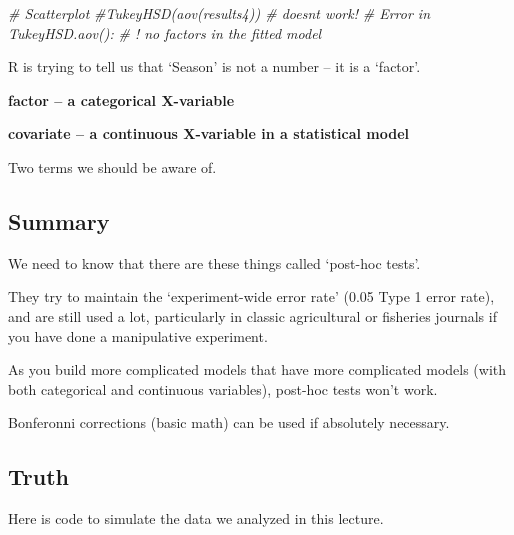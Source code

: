 \documentclass[
]{article}
\newenvironment{Shaded}{\begin{snugshade}}{\end{snugshade}}
\newcommand{\CommentTok}[1]{\textcolor[rgb]{0.56,0.35,0.01}{\textit{#1}}}
\begin{document}
\begin{Shaded}
\begin{Highlighting}[]
\CommentTok{\# Scatterplot}
\CommentTok{\#TukeyHSD(aov(results4)) \# doesn\textquotesingle{}t work!}
\CommentTok{\# Error in \textasciigrave{}TukeyHSD.aov()\textasciigrave{}:}
\CommentTok{\# ! no factors in the fitted model}
\end{Highlighting}
\end{Shaded}

R is trying to tell us that `Season' is not a number -- it is a
`factor'.

\textbf{factor -- a categorical X-variable}

\textbf{covariate -- a continuous X-variable in a statistical model}

Two terms we should be aware of.

\subsection{Summary}\label{summary}

We need to know that there are these things called `post-hoc tests'.

They try to maintain the `experiment-wide error rate' (0.05 Type 1 error
rate), and are still used a lot, particularly in classic agricultural or
fisheries journals if you have done a manipulative experiment.

As you build more complicated models that have more complicated models
(with both categorical and continuous variables), post-hoc tests won't
work.

Bonferonni corrections (basic math) can be used if absolutely necessary.

\subsection{Truth}\label{truth}

Here is code to simulate the data we analyzed in this lecture.
\end{document}
